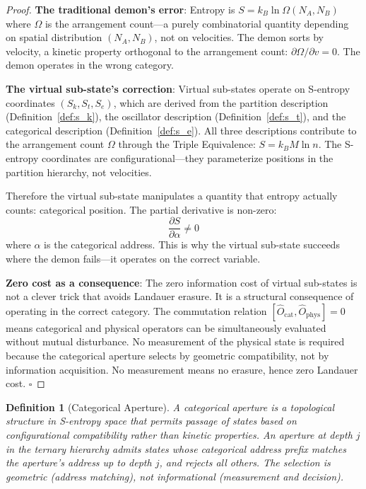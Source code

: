 \documentclass[12pt,twocolumn]{article}
\newtheorem{definition}{Definition}[section]
\begin{document}
\begin{proof}
\textbf{The traditional demon's error}: Entropy is $S = k_B \ln \Omega(N_A, N_B)$ where $\Omega$ is the arrangement count---a purely combinatorial quantity depending on spatial distribution $(N_A, N_B)$, not on velocities. The demon sorts by velocity, a kinetic property orthogonal to the arrangement count: $\partial \Omega / \partial v = 0$. The demon operates in the wrong category.

\textbf{The virtual sub-state's correction}: Virtual sub-states operate on S-entropy coordinates $(S_k, S_t, S_e)$, which are derived from the partition description (Definition~\ref{def:s_k}), the oscillator description (Definition~\ref{def:s_t}), and the categorical description (Definition~\ref{def:s_e}). All three descriptions contribute to the arrangement count $\Omega$ through the Triple Equivalence: $S = k_B M \ln n$. The S-entropy coordinates are configurational---they parameterize positions in the partition hierarchy, not velocities.

Therefore the virtual sub-state manipulates a quantity that entropy actually counts: categorical position. The partial derivative is non-zero:
\begin{equation}
\frac{\partial S}{\partial \alpha} \neq 0
\end{equation}
where $\alpha$ is the categorical address. This is why the virtual sub-state succeeds where the demon fails---it operates on the correct variable.

\textbf{Zero cost as a consequence}: The zero information cost of virtual sub-states is not a clever trick that avoids Landauer erasure. It is a structural consequence of operating in the correct category. The commutation relation $[\hat{O}_{\text{cat}}, \hat{O}_{\text{phys}}] = 0$ means categorical and physical operators can be simultaneously evaluated without mutual disturbance. No measurement of the physical state is required because the categorical aperture selects by geometric compatibility, not by information acquisition. No measurement means no erasure, hence zero Landauer cost. $\square$
\end{proof}

\begin{definition}[Categorical Aperture]
\label{def:aperture}
A \emph{categorical aperture} is a topological structure in S-entropy space that permits passage of states based on configurational compatibility rather than kinetic properties. An aperture at depth $j$ in the ternary hierarchy admits states whose categorical address prefix matches the aperture's address up to depth $j$, and rejects all others. The selection is geometric (address matching), not informational (measurement and decision).
\end{definition}
\end{document}
